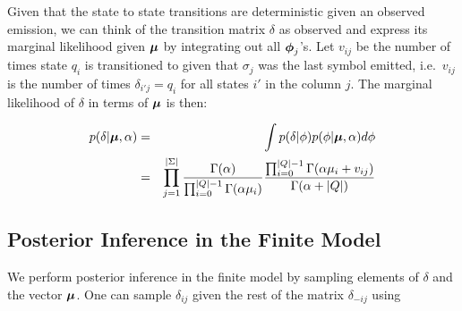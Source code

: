  
 
 Given that the state to state transitions are deterministic given an observed emission, we can think of the transition matrix $\delta$ as observed and express its marginal likelihood given $\bmu$ by integrating out all $\bphi_j$'s.  Let $v_{ij}$ be the number of times state $q_i$ is transitioned to given that $\sigma_j$ was the last symbol emitted, i.e.~$v_{ij}$ is the number of times $\delta_{i'j} = q_i$ for all states $i'$ in the column $j$. %
The marginal likelihood of $\delta$ in terms of $\bmu$ is then:
 
 \begin{eqnarray}
 p(\delta|\bmu,\alpha) & = & \int p(\delta|\phi)p(\phi|\bmu,\alpha) d\phi \label{delta:factor}\\
  & = &  \prod_{j=1}^{|\Sigma|} \frac{\Gamma(\alpha)}{\prod_{i=0}^{|Q|-1}\Gamma(\alpha\mu_i)} \frac{\prod_{i=0}^{|Q|-1} \Gamma(\alpha\mu_i + v_{ij})}{\Gamma(\alpha + |Q|)} \label{delta:end}
  \end{eqnarray}



 
 \subsection{Posterior Inference in the Finite Model}
 
We perform posterior inference in the finite model by sampling elements of $\delta$ and the vector $\bmu$.  %
One can sample $\delta_{ij}$ given the rest of the matrix $\delta_{-ij}$ using 

